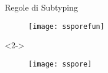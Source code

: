 \begin{frame}{Regole di Subtyping}
	\begin{figure}
		\centering\texttt{[image: ssporefun]}
	\end{figure}
	
	\begin{onlyenv}<2->
		\begin{figure}
			\centering\texttt{[image: sspore]}
		\end{figure}
	\end{onlyenv}
\end{frame}